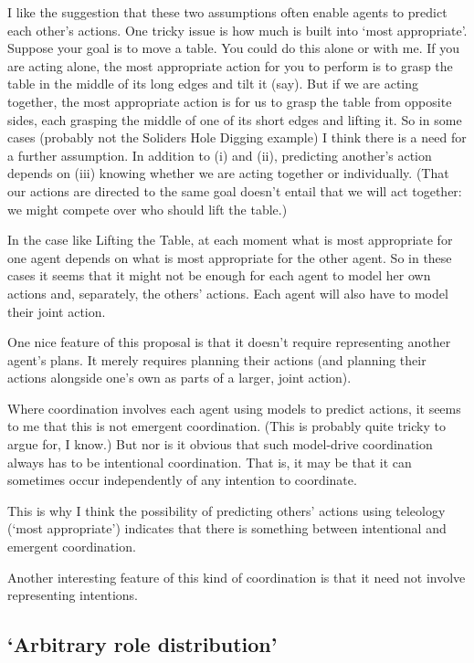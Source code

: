 \documentclass[12pt,\papersize]{extarticle}
\begin{document}
I like the suggestion that these two assumptions often enable agents to predict each other's actions.  One tricky issue is how much is built into `most appropriate'.  Suppose your goal is to move a table.  You could do this alone or with me.  If you are acting alone, the most appropriate action for you to perform is to grasp the table in the middle of its long edges and tilt it (say).  But if we are acting together, the most appropriate action is for  us to grasp the table from opposite sides, each grasping the middle of one of its short edges and lifting it.  So in some cases (probably not the Soliders Hole Digging example) I think there is a need for a further assumption.  In addition to (i) and (ii), predicting another's action depends on (iii) knowing whether we are acting together or individually.  (That our actions are directed to the same goal doesn't entail that we will act together: we might compete over who should lift the table.)

In the case like Lifting the Table, at each moment what is most appropriate for one agent depends on what is most appropriate for the other agent.  So in these cases it seems that it might not be enough for each agent to model her own actions and, separately, the others' actions.  Each agent will also have to model their joint action.

One nice feature of this proposal is that it doesn't require representing another agent's plans.  It merely requires planning their actions (and planning their actions alongside one's own as parts of a larger, joint action).

Where coordination involves each agent using models to predict actions, it seems to me that this is not emergent coordination.  (This is probably quite tricky to argue for, I know.)  But nor is it obvious that such model-drive coordination always has to be intentional coordination.  That is, it may be that it can sometimes occur independently of any intention to coordinate.  

This is why I think the possibility of predicting others' actions using teleology (`most appropriate') indicates that there is something between intentional and emergent coordination.

Another interesting feature of this kind of coordination is that it need not involve representing intentions.


\subsection{`Arbitrary role distribution'}
\end{document}
